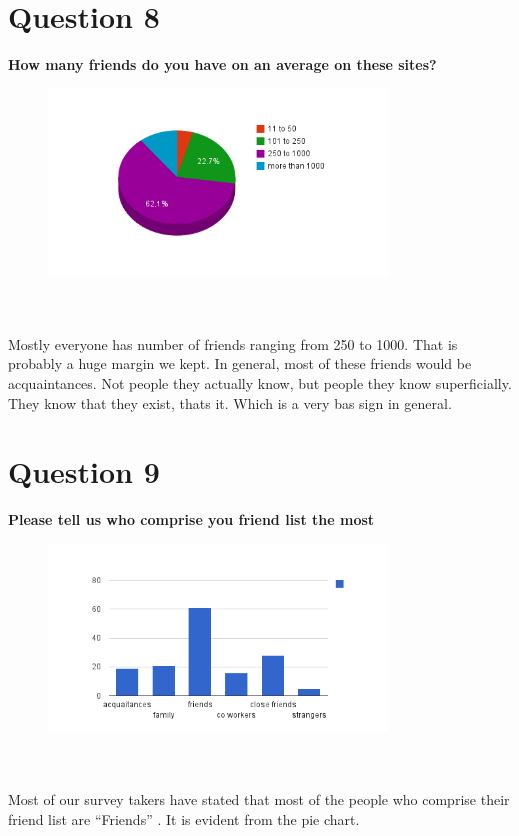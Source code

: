 \documentclass[11pt]{book}
\begin{document}
\chapter{Question 8}
\textbf{How many friends do you have on an average on these sites?
}
\begin{figure}[ht!]
	\centering
	\includegraphics[width=90mm]{questions/8.png}
	\label{overflow}
\end{figure}
\\\\Mostly everyone has number of friends ranging from 250 to 1000. That is probably a huge margin we kept. 
In general, most of these friends would be acquaintances. Not people they actually know, but people they know superficially. 
They know that they exist, thats it. Which is a very bas sign in general. 

\newpage
\chapter{Question 9}
\textbf{Please tell us who comprise you friend list the most
}
\begin{figure}[ht!]
	\centering
	\includegraphics[width=90mm]{questions/9.png}
	\label{overflow}
\end{figure}
\\\\Most of our survey takers have stated that most of the people who comprise their friend list are ``Friends'' . 
It is evident from the pie chart. 

\newpage
\end{document}
